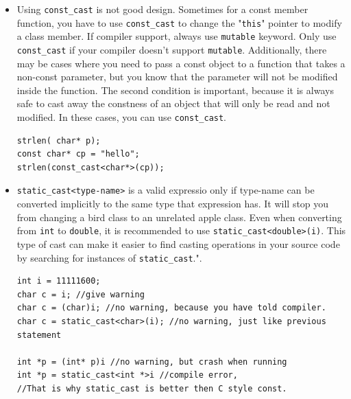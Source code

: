 \documentclass[a4paper,11pt,twoside]{book}
\begin{document}
\begin{itemize}
	\item Using \texttt{const\_cast} is not good design. Sometimes for a const member function, you have to use \texttt{const\_cast} to change the "\texttt{this}" pointer to modify a class member. If compiler support, always use \texttt{mutable}  keyword.  Only use \texttt{const\_cast} if your compiler doesn't support \texttt{mutable}. Additionally, there may be cases where you need to pass a const object to a function that takes a non-const parameter, but you know that the parameter will not be modified inside the function. The second condition is important, because it is always safe to cast away the constness of an object that will only be read and not modified. In these cases, you can use \texttt{const\_cast}.

\begin{lstlisting}[numbers = none]
strlen( char* p);
const char* cp = "hello";
strlen(const_cast<char*>(cp));	
\end{lstlisting}

	\item \texttt{static\_cast<type-name>} is a valid expressio only if type-name can be converted implicitly to the same type that expression has.  It will stop you from changing a bird class to an unrelated apple class.  Even when converting from \texttt{int} to \texttt{double}, it is recommended to use \texttt{static\_cast<double>(i)}.  This type of cast can make it easier to find casting operations in your source code by searching for instances of \texttt{static\_cast}.".
\begin{lstlisting}[numbers = none]
int i = 11111600;
char c = i; //give warning
char c = (char)i; //no warning, because you have told compiler.
char c = static_cast<char>(i); //no warning, just like previous statement

int *p = (int* p)i //no warning, but crash when running
int *p = static_cast<int *>i //compile error, 
//That is why static_cast is better then C style const.
\end{lstlisting}

%
	

\end{itemize}
\end{document}

